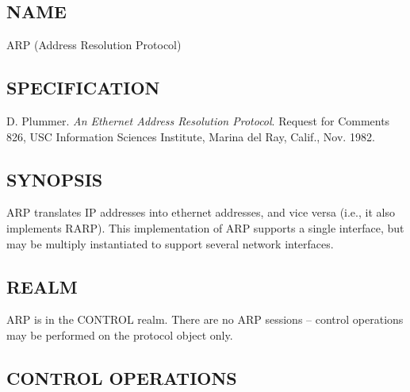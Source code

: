 \subsection*{NAME}

\noindent ARP (Address Resolution Protocol)

\subsection*{SPECIFICATION}

\noindent D. Plummer. {\it An Ethernet Address Resolution Protocol}.
Request for Comments 826, USC Information Sciences Institute, Marina
del Ray, Calif., Nov. 1982.

\subsection*{SYNOPSIS}

\noindent ARP translates IP addresses into ethernet addresses, and
vice versa (i.e., it also implements RARP).  This implementation of
ARP supports a single interface, but may be multiply instantiated to
support several network interfaces.

\subsection*{REALM}

ARP is in the CONTROL realm.  There are no ARP sessions -- control
operations may be performed on the protocol object only.

\subsection*{CONTROL OPERATIONS}

